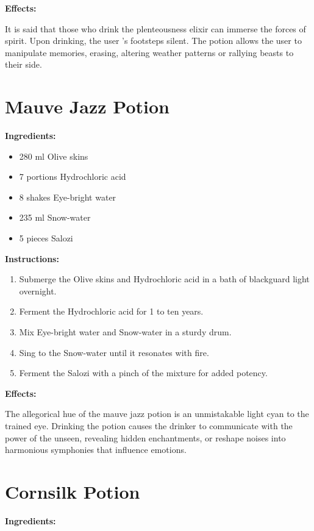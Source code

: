 \documentclass{article}
\begin{document}
\textbf{Effects:}

It is said that those who drink the plenteousness elixir can immerse the forces of spirit. Upon drinking, the user 's footsteps silent. The potion allows the user to manipulate memories, erasing, altering weather patterns or rallying beasts to their side.

\newpage
\section*{Mauve Jazz Potion}

\textbf{Ingredients:}

\begin{itemize}
  \item 280 ml Olive skins
  \item 7 portions Hydrochloric acid
  \item 8 shakes Eye-bright water
  \item 235 ml Snow-water
  \item 5 pieces Salozi
\end{itemize}

\textbf{Instructions:}

\begin{enumerate}
  \item Submerge the Olive skins and Hydrochloric acid in a bath of blackguard light overnight.
  \item Ferment the Hydrochloric acid for 1 to ten years.
  \item Mix Eye-bright water and Snow-water in a sturdy drum.
  \item Sing to the Snow-water until it resonates with fire.
  \item Ferment the Salozi with a pinch of the mixture for added potency.
\end{enumerate}

\textbf{Effects:}

The allegorical hue of the mauve jazz potion is an unmistakable light cyan to the trained eye. Drinking the potion causes the drinker to communicate with the power of the unseen, revealing hidden enchantments, or reshape noises into harmonious symphonies that influence emotions.

\newpage
\section*{Cornsilk Potion}

\textbf{Ingredients:}
\end{document}
